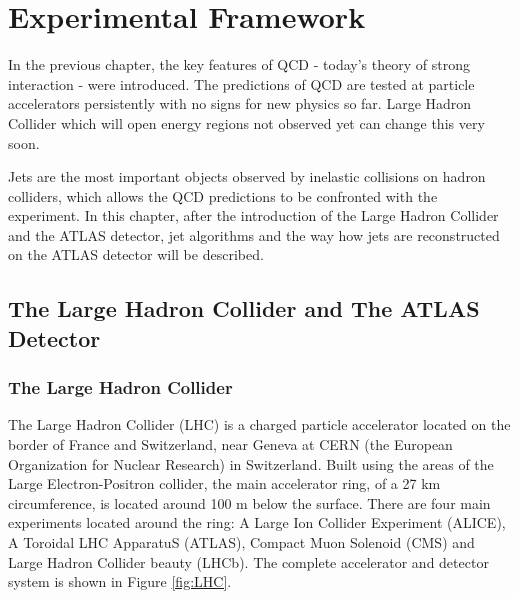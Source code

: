 \chapter{Experimental Framework}


In the previous chapter, the key features of QCD - today's theory of strong
interaction - were introduced. The predictions of QCD are tested at particle
accelerators persistently with no signs for new physics so far. Large Hadron
Collider which will open energy regions not observed yet can change this very
soon.

Jets are the most important objects observed by inelastic collisions on hadron
colliders, which allows the QCD predictions to be confronted with the
experiment. In this chapter, after the introduction of the Large Hadron Collider
and the ATLAS detector, jet algorithms and the way how jets are reconstructed on
the ATLAS detector will be described.

\section{The Large Hadron Collider and The ATLAS Detector}

\subsection{The Large Hadron Collider}

The Large Hadron Collider (LHC) \cite{LHC, LHCPastPresentFuture} is a charged
particle accelerator located on the border of France and Switzerland, near
Geneva at CERN (the European Organization for Nuclear Research) in Switzerland.
Built using the areas of the Large Electron-Positron collider, the main
accelerator ring, of a 27 km circumference, is located around 100 m below the
surface. There are four main experiments located around the ring: A Large Ion
Collider Experiment (ALICE), A Toroidal LHC ApparatuS (ATLAS), Compact Muon
Solenoid (CMS) and Large Hadron Collider beauty (LHCb). The complete accelerator
and detector system is shown in Figure \ref{fig:LHC}.

